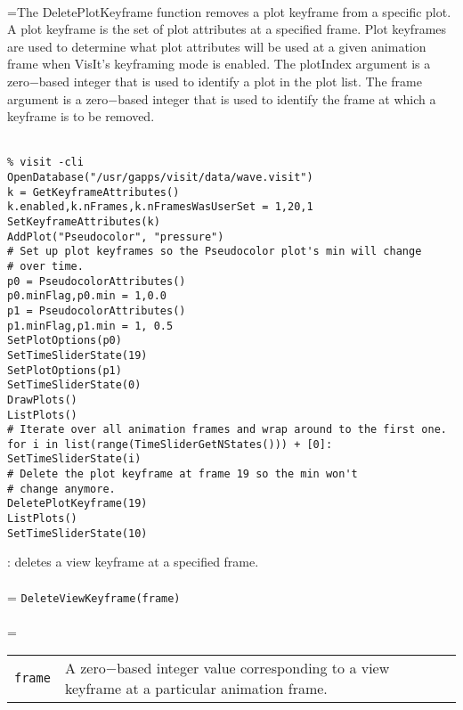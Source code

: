 \documentclass[10pt,a4paper]{report}
\begin{document}
 \\ 
\hangindent=\parindent The DeletePlotKeyframe function removes a plot keyframe from a specific plot. A plot keyframe is the set of plot attributes at a specified frame. Plot keyframes are used to determine what plot attributes will be used at a given animation frame when VisIt's keyframing mode is enabled. The plotIndex argument is a zero$-$based integer that is used to identify a plot in the plot list. The frame argument is a zero$-$based integer that is used to identify the frame at which a keyframe is to be removed. \\[-3mm] 

\\[-6mm]
\begin{verbatim}% visit -cli
OpenDatabase("/usr/gapps/visit/data/wave.visit")
k = GetKeyframeAttributes()
k.enabled,k.nFrames,k.nFramesWasUserSet = 1,20,1
SetKeyframeAttributes(k)
AddPlot("Pseudocolor", "pressure")
# Set up plot keyframes so the Pseudocolor plot's min will change
# over time.
p0 = PseudocolorAttributes()
p0.minFlag,p0.min = 1,0.0
p1 = PseudocolorAttributes()
p1.minFlag,p1.min = 1, 0.5
SetPlotOptions(p0)
SetTimeSliderState(19)
SetPlotOptions(p1)
SetTimeSliderState(0)
DrawPlots()
ListPlots()
# Iterate over all animation frames and wrap around to the first one.
for i in list(range(TimeSliderGetNStates())) + [0]:
SetTimeSliderState(i)
# Delete the plot keyframe at frame 19 so the min won't 
# change anymore.
DeletePlotKeyframe(19)
ListPlots()
SetTimeSliderState(10)
\end{verbatim}
\newpage


{}
: deletes a view keyframe at a specified frame.\\[-3mm]

 \\ 
\hangindent=\parindent 
\verb!DeleteViewKeyframe(frame)!\\ [-3mm]

 \\ 
\hangindent=\parindent 
\begin{tabular}{lp{9cm}}
\verb!frame! & A zero$-$based integer value corresponding to a view keyframe at a particular animation frame. \\
\end{tabular} \\[-2mm]
\end{document}
